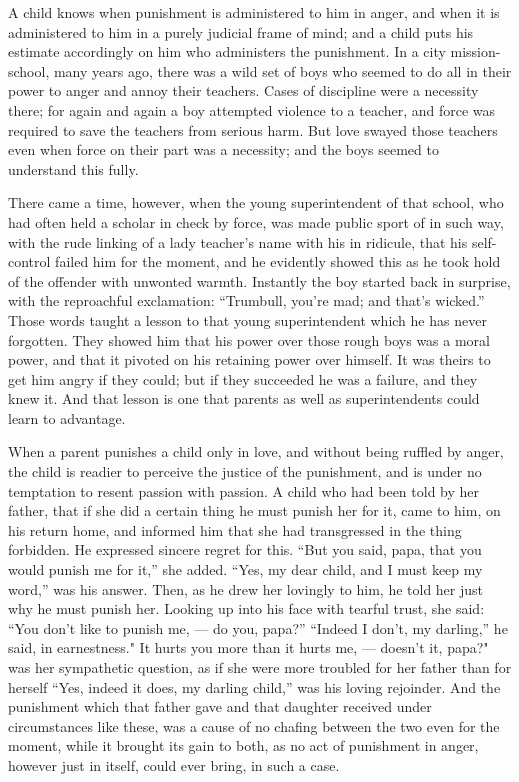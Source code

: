 \documentclass[
]{book}
\begin{document}
A child knows when punishment is administered to him in anger, and when it is administered to him in a purely judicial frame of mind; and a child puts his estimate accordingly on him who administers the punishment. In a city mission-school, many years ago, there was a wild set of boys who seemed to do all in their power to anger and annoy their teachers. Cases of discipline were a necessity there; for again and again a boy attempted violence to a teacher, and force was required to save the teachers from serious harm. But love swayed those teachers even when force on their part was a necessity; and the boys seemed to understand this fully.

There came a time, however, when the young superintendent of that school, who had often held a scholar in check by force, was made public sport of in such way, with the rude linking of a lady teacher's name with his in ridicule, that his self-control failed him for the moment, and he evidently showed this as he took hold of the offender with unwonted warmth. Instantly the boy started back in surprise, with the reproachful exclamation: ``Trumbull, you're mad; and that's wicked.'' Those words taught a lesson to that young superintendent which he has never forgotten. They showed him that his power over those rough boys was a moral power, and that it pivoted on his retaining power over himself. It was theirs to get him angry if they could; but if they succeeded he was a failure, and they knew it. And that lesson is one that parents as well as superintendents could learn to advantage.

When a parent punishes a child only in love, and without being ruffled by anger, the child is readier to perceive the justice of the punishment, and is under no temptation to resent passion with passion. A child who had been told by her father, that if she did a certain thing he must punish her for it, came to him, on his return home, and informed him that she had transgressed in the thing forbidden. He expressed sincere regret for this. ``But you said, papa, that you would punish me for it,'' she added. ``Yes, my dear child, and I must keep my word,'' was his answer. Then, as he drew her lovingly to him, he told her just why he must punish her. Looking up into his face with tearful trust, she said: ``You don't like to punish me, --- do you, papa?'' ``Indeed I don't, my darling,'' he said, in earnestness." It hurts you more than it hurts me, --- doesn't it, papa?" was her sympathetic question, as if she were more troubled for her father than for herself ``Yes, indeed it does, my darling child,'' was his loving rejoinder. And the punishment which that father gave and that daughter received under circumstances like these, was a cause of no chafing between the two even for the moment, while it brought its gain to both, as no act of punishment in anger, however just in itself, could ever bring, in such a case.
\end{document}
